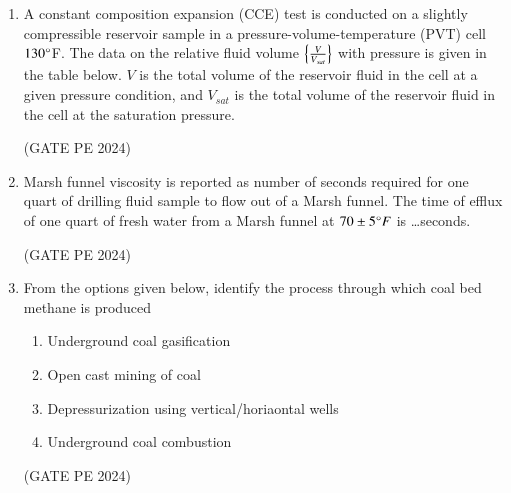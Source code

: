 \documentclass[journal,12pt,onecolumn]{IEEEtran}
\theoremstyle{remark}
\begin{document}
\begin{enumerate}
\item A constant composition expansion (CCE) test is conducted on a slightly compressible reservoir sample in a pressure-volume-temperature (PVT) cell $130\degree$F. The data on the relative fluid volume $\left\{\frac{V}{V_{sat}}\right\}$ with pressure is given in the table below. $V$ is the total volume of the reservoir fluid in the cell at a given pressure condition, and $V_{sat}$ is the total volume of the reservoir fluid in the cell at the saturation pressure.\\

\begin{enumerate}
\end{enumerate}
\hfill{(GATE PE 2024)}

\item Marsh funnel viscosity is reported as number of seconds required for one quart of drilling fluid sample to flow out of a Marsh funnel. The time of efflux of one quart of fresh water from a Marsh funnel at $70\pm5\degree F$ is \dots seconds.
\begin{enumerate}
\end{enumerate}
\hfill{(GATE PE 2024)}


\item From the options given below, identify the process through which coal bed methane is produced
\begin{enumerate}
    \item Underground coal gasification
    \item Open cast mining of coal
    \item Depressurization using vertical/horiaontal wells
    \item Underground coal combustion
\end{enumerate}
\hfill{(GATE PE 2024)}


\end{enumerate}
\end{document}
